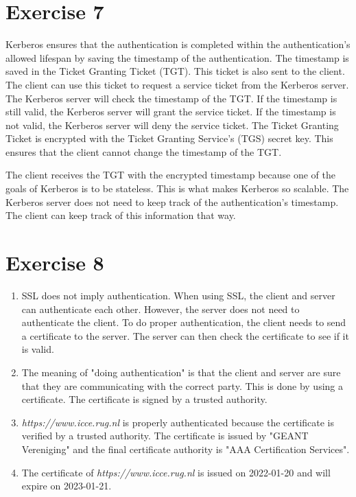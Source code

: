 \documentclass[twoside, a4paper, fleqn, reqno]{article}
\begin{document}
\section*{Exercise 7}

Kerberos ensures that the authentication is completed within the authentication's allowed lifespan
by saving the timestamp of the authentication. The timestamp is saved in the Ticket Granting Ticket (TGT).
This ticket is also sent to the client. The client can use this ticket to request a service ticket from the
Kerberos server. The Kerberos server will check the timestamp of the TGT. If the timestamp is still valid,
the Kerberos server will grant the service ticket. If the timestamp is not valid, the Kerberos server will
deny the service ticket.
The Ticket Granting Ticket is encrypted with the Ticket Granting Service's (TGS) secret key. This ensures
that the client cannot change the timestamp of the TGT.

The client receives the TGT with the encrypted timestamp because one of the goals of Kerberos is to
be stateless. This is what makes Kerberos so scalable. The Kerberos server does not need to keep track
of the authentication's timestamp. The client can keep track of this information that way.

\section*{Exercise 8}

\begin{enumerate}
	\item SSL does not imply authentication. When using SSL, the client and server can authenticate each other.
	However, the server does not need to authenticate the client. To do proper authentication, the client
	needs to send a certificate to the server. The server can then check the certificate to see if it is valid.
	\item The meaning of "doing authentication" is that the client and server are sure that they are communicating
	with the correct party. This is done by using a certificate. The certificate is signed by a trusted authority.
	\item \textit{https://www.icce.rug.nl} is properly authenticated because the certificate is verified by a trusted authority.
	The certificate is issued by "GEANT Vereniging" and the final certificate authority is "AAA Certification Services".
	\item The certificate of \textit{https://www.icce.rug.nl} is issued on 2022-01-20 and will expire on 2023-01-21.
\end{enumerate}
\end{document}
